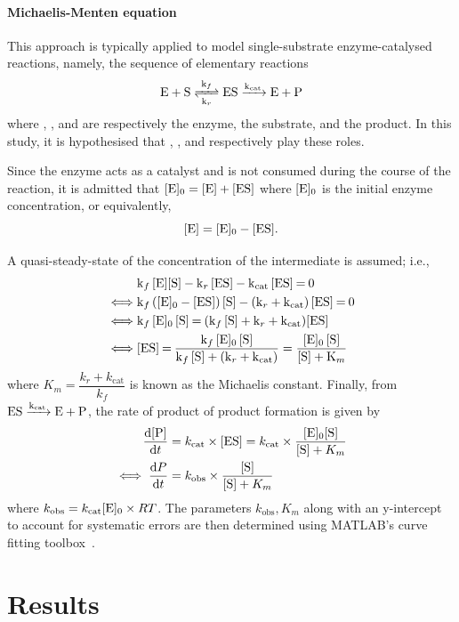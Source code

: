 \documentclass[a4paper, 12pt]{article}
\begin{document}
\paragraph{Michaelis-Menten equation}
This approach is typically applied to model single-substrate enzyme-catalysed reactions, namely, the sequence of elementary reactions
\[
\ce{E + S <=>[ k_f ][ k_r ] ES ->[ k_{\text{cat}} ] E + P}
\]
where , , and  are respectively the enzyme, the substrate, and the product. In this study, it is hypothesised that , , and  respectively play these roles.

Since the enzyme acts as a catalyst and is not consumed during the course of the reaction, it is admitted that $\ce{[E]_0} = \ce{[E] + [ES]}$ where $\ce{[E]_0}$ is the initial enzyme concentration, or equivalently, 
\[
\ce{[E]} = \ce{[E]_0 - [ES]}.
\]

A quasi-steady-state of the concentration of the intermediate  is assumed; i.e., 
\begin{align*}
    &\ce{k_f [E][S] - k_r [ES] - k_{\text{cat}} [ES] = 0}\\
    \iff &\ce{k_f ([E]_0 - [ES]) [S] - (k_r + k_{\text{cat}}) [ES] = 0}\\
    \iff &\ce{k_f [E]_0 [S] = (k_f [S] + k_r + k_{\text{cat}})[ES]}\\
    \iff &\ce{[ES] = \frac{k_f [E]_0 [S]}{k_f [S] + (k_r + k_{\text{cat}})}}
    = \ce{\frac{[E]_0 [S]}{[S] + K_m}}
\end{align*}
where $K_m = \dfrac{k_r + k_\text{cat}}{k_f}$ is known as the Michaelis constant. Finally, from $\ce{ES ->[k_{\text{cat}}] E + P}$, the rate of product of product formation is given by
\begin{align}
    \dv{\ce{[P]}}{t} &= k_{\text{cat}} \times \ce{[ES]} = k_{\text{cat}} \times \frac{\ce{[E]_0[S]}}{\ce{[S]} + K_m}
\nonumber\\
    \iff \dv{P}{t} &= k_{\text{obs}} \times \frac{\ce{[S]}}{\ce{[S]} + K_m}\label{eq:mm}
\end{align}
where $k_{\text{obs}} = k_\text{cat} \ce{[E]_0} \times R T$. The parameters $k_{\text{obs}}, K_m$ along with an y-intercept to account for systematic errors are then determined using MATLAB's curve fitting toolbox~\cite{matlab}.

\section*{Results}
\end{document}
